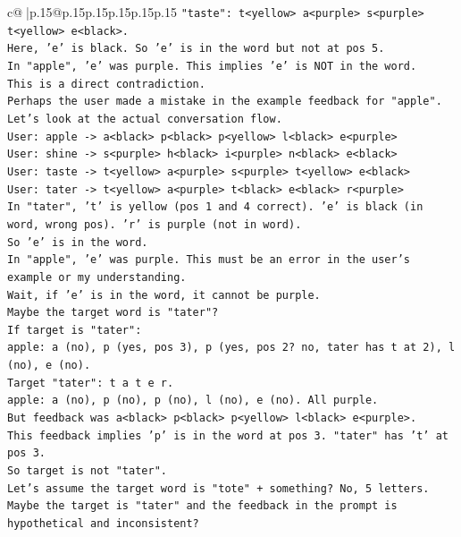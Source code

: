 \documentclass{article}
\begin{document}
{\begin{supertabular}{c@{$\;$}|p{.15\linewidth}@{}p{.15\linewidth}p{.15\linewidth}p{.15\linewidth}p{.15\linewidth}p{.15\linewidth}}
{{{\texttt{"taste": t<yellow> a<purple> s<purple> t<yellow> e<black>.} \\
\texttt{Here, 'e' is black. So 'e' is in the word but not at pos 5.} \\
\texttt{In "apple", 'e' was purple. This implies 'e' is NOT in the word.} \\
\texttt{This is a direct contradiction.} \\
\texttt{Perhaps the user made a mistake in the example feedback for "apple".} \\
\texttt{Let's look at the actual conversation flow.} \\
\texttt{User: apple {-}> a<black> p<black> p<yellow> l<black> e<purple>} \\
\texttt{User: shine {-}> s<purple> h<black> i<purple> n<black> e<black>} \\
\texttt{User: taste {-}> t<yellow> a<purple> s<purple> t<yellow> e<black>} \\
\texttt{User: tater {-}> t<yellow> a<purple> t<black> e<black> r<purple>} \\
\texttt{In "tater", 't' is yellow (pos 1 and 4 correct). 'e' is black (in word, wrong pos). 'r' is purple (not in word).} \\
\texttt{So 'e' is in the word.} \\
\texttt{In "apple", 'e' was purple. This must be an error in the user's example or my understanding.} \\
\texttt{Wait, if 'e' is in the word, it cannot be purple.} \\
\texttt{Maybe the target word is "tater"?} \\
\texttt{If target is "tater":} \\
\texttt{apple: a (no), p (yes, pos 3), p (yes, pos 2? no, tater has t at 2), l (no), e (no).} \\
\texttt{Target "tater": t a t e r.} \\
\texttt{apple: a (no), p (no), p (no), l (no), e (no). All purple.} \\
\texttt{But feedback was a<black> p<black> p<yellow> l<black> e<purple>.} \\
\texttt{This feedback implies 'p' is in the word at pos 3. "tater" has 't' at pos 3.} \\
\texttt{So target is not "tater".} \\
\texttt{Let's assume the target word is "tote" + something? No, 5 letters.} \\
\texttt{Maybe the target is "tater" and the feedback in the prompt is hypothetical and inconsistent?} \\
}}}
\end{supertabular}}
\end{document}
